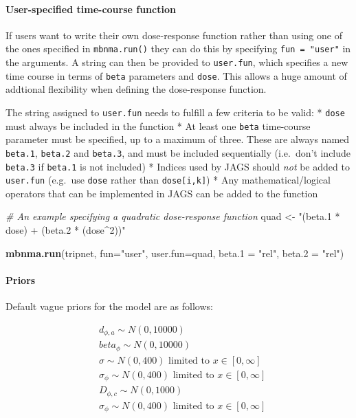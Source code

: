 \documentclass[]{article}
\newenvironment{Shaded}{\begin{snugshade}}{\end{snugshade}}
\newcommand{\CommentTok}[1]{\textcolor[rgb]{0.56,0.35,0.01}{\textit{#1}}}
\newcommand{\DataTypeTok}[1]{\textcolor[rgb]{0.13,0.29,0.53}{#1}}
\newcommand{\KeywordTok}[1]{\textcolor[rgb]{0.13,0.29,0.53}{\textbf{#1}}}
\newcommand{\NormalTok}[1]{#1}
\newcommand{\StringTok}[1]{\textcolor[rgb]{0.31,0.60,0.02}{#1}}
\let\oldparagraph\paragraph
\renewcommand{\paragraph}[1]{\oldparagraph{#1}\mbox{}}
\begin{document}
\hypertarget{user-specified-time-course-function}{%
\paragraph{User-specified time-course
function}\label{user-specified-time-course-function}}

If users want to write their own dose-response function rather than
using one of the ones specified in \texttt{mbnma.run()} they can do this
by specifying \texttt{fun\ =\ "user"} in the arguments. A string can
then be provided to \texttt{user.fun}, which specifies a new time course
in terms of \texttt{beta} parameters and \texttt{dose}. This allows a
huge amount of addtional flexibility when defining the dose-response
function.

The string assigned to \texttt{user.fun} needs to fulfill a few criteria
to be valid: * \texttt{dose} must always be included in the function *
At least one \texttt{beta} time-course parameter must be specified, up
to a maximum of three. These are always named \texttt{beta.1},
\texttt{beta.2} and \texttt{beta.3}, and must be included sequentially
(i.e.~don't include \texttt{beta.3} if \texttt{beta.1} is not included)
* Indices used by JAGS should \emph{not} be added to \texttt{user.fun}
(e.g.~use \texttt{dose} rather than \texttt{dose{[}i,k{]}}) * Any
mathematical/logical operators that can be implemented in JAGS can be
added to the function

\begin{Shaded}
\begin{Highlighting}[]
\CommentTok{# An example specifying a quadratic dose-response function}
\NormalTok{quad <-}\StringTok{ "(beta.1 * dose) + (beta.2 * (dose^2))"}

\KeywordTok{mbnma.run}\NormalTok{(tripnet, }\DataTypeTok{fun=}\StringTok{"user"}\NormalTok{, }\DataTypeTok{user.fun=}\NormalTok{quad, }
          \DataTypeTok{beta.1 =} \StringTok{"rel"}\NormalTok{, }\DataTypeTok{beta.2 =} \StringTok{"rel"}\NormalTok{)}
\end{Highlighting}
\end{Shaded}

\hypertarget{priors}{%
\paragraph{Priors}\label{priors}}

Default vague priors for the model are as follows:

\[
\begin{aligned}
  &d_{\phi,a} \sim N(0,10000)\\
  &beta_{\phi} \sim N(0,10000)\\
  &\sigma \sim N(0,400) \text{  limited to  } x \in [0,\infty]\\
  &\sigma_{\phi} \sim N(0,400) \text{  limited to  } x \in [0,\infty]\\
  &D_{\phi,c} \sim N(0,1000)\\
  &\sigma_{\phi} \sim N(0,400) \text{ limited to } x \in [0,\infty]\\
\end{aligned}
\]
\end{document}
